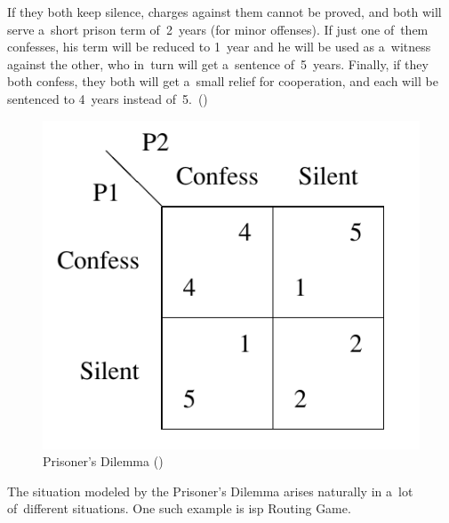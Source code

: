 \begin{description}
    If they both keep silence, charges against them cannot be proved, and both will serve a~short prison term of~2~years (for minor offenses).
    If just one of~them confesses, his term will be reduced to 1~year and he will be used as a~witness against the other, who in~turn will get a~sentence of~5~years.
    Finally, if they both confess, they both will get a~small relief for cooperation, and each will be sentenced to 4~years instead of~5.~(\cite[Section~1.1.1]{AGT07})
    \begin{figure}[H]
      \centering
      \includegraphics[width=.25\paperwidth]{../img/prisoner.png}
      \caption[Prisoner's Dilemma]{Prisoner's Dilemma (\cite{AGT07})}
      \label{fig:prisoner}
    \end{figure}
    The situation modeled by the Prisoner's Dilemma arises naturally in a~lot of~different situations.
    One such example is \acrshort{isp} Routing Game.


\end{description}
